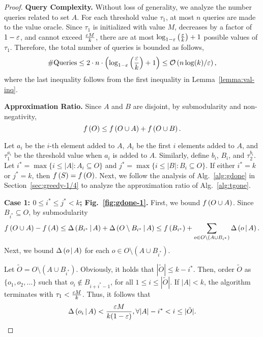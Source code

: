 \begin{proof}
\textbf{Query Complexity.}
Without loss of generality, we analyze the number queries related to set $A$.
For each threshold value $\tau_1$, at most $n$ queries are made to the value oracle.
Since $\tau_1$ is initialized with value $M$, decreases by a factor of $1-\varepsilon$,
and cannot exceed $\frac{\varepsilon M}{k}$,
there are at most $\log_{1-\varepsilon}\left(\frac{\varepsilon}{k}\right)+1$ possible values of $\tau_1$.
Therefore, the total number of queries is bounded as follows,
\begin{align*}
\#\text{Queries} \le 2\cdot n\cdot \left(\log_{1-\varepsilon}\left(\frac{\varepsilon}{k}\right)+1\right)
\le \mathcal O \left( n\log(k)/\varepsilon \right),
\end{align*}
where the last inequality follows from the first inequality in Lemma~\ref{lemma:val-inq}.

\textbf{Approximation Ratio.}
Since $A$ and $B$ are disjoint, by submodularity and non-negativity,
\begin{equation}\label{inq:tgone-1}
f \left( O \right) \le f \left( O\cup A \right) + f \left( O\cup B \right).
\end{equation}

Let $a_i$ be the $i$-th element added to $A$,
$A_i$ be the first $i$ elements added to $A$,
and $\tau_1^{a_i}$ be the threshold value when $a_i$ is added to $A$.
Similarly, define $b_i$, $B_i$, and $\tau_2^{b_i}$.
Let $i^* = \max\{i \le |A|: A_i \subseteq O\}$
and $j^* = \max\{i \le |B|: B_i \subseteq O\}$.
If either $i^*= k$ or $j^* = k$,
then $f \left( S \right)= f \left( O \right)$.
Next, we follow the analysis of Alg.~\ref{alg:gdone} in Section~\ref{sec:greedy-1/4}
to analyze the approximation ratio of Alg.~\ref{alg:tgone}.

\textbf{Case 1: $0\le i^*\le j^* < k$; Fig.~\ref{fig:gdone-1}.}
First, we bound $f \left( O\cup A \right)$. 
Since $B_{i^*} \subseteq O$, by submodularity
\begin{equation}\label{inq:tgone-3}
f \left( O\cup A \right) - f \left( A \right) \le \Delta \left( B_{i^*} \, \middle| \, A \right) + \Delta \left( O\setminus B_{i^*} \, \middle| \, A \right)
\le f \left( B_{i^*} \right)+ \sum_{o\in O\setminus \left(A\cup B_{i^*}\right)}\Delta \left( o \, \middle| \, A \right).
\end{equation}
Next, we bound $\Delta \left( o \, \middle| \, A \right)$ for each $o\in O\setminus \left(A\cup B_{i^*}\right)$.

Let $\tilde{O} = O\setminus \left(A \cup B_{i^*}\right)$.
Obviously, it holds that $|\tilde{O}|\le k-i^*$.
Then, order $\tilde{O}$ as $\{o_1, o_2, \ldots\}$ such that $o_i \not \in B_{i+i^*-1}$,
for all $1\le i \le |\tilde{O}|$.
If $|A| < k$, the algorithm terminates with $\tau_1 < \frac{\varepsilon M}{k}$.
Thus, it follows that
\begin{equation}\label{inq:tgone-4}
\Delta \left( o_i \, \middle| \, A \right) < \frac{\varepsilon M}{k(1-\varepsilon)}, \forall |A|-i^* < i \le |\tilde{O}|.
\end{equation}


\end{proof}
